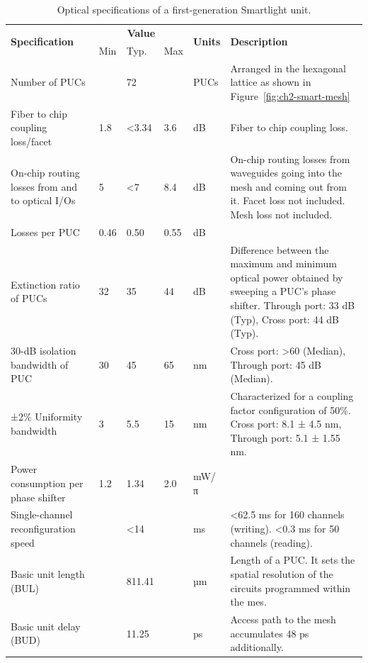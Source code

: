 \begin{table}[ht!]
  \small
	\centering
	\begin{tabular}{|m{4cm}|m{1.0cm}|m{1.0cm}|m{1.0cm}|m{1.5cm}|m{5.5cm}|}
		\hline
		\multirow{2}{*}{\textbf{Specification}}         & \multicolumn{3}{c|}{\textbf{Value}} & \multirow{2}{*}{\textbf{Units}} & \multirow{2}{*}{\textbf{Description}}                                                                                                                                                                                                                                                                                                                              \\
		\cline{2-4}  %
		           & Min     & Typ.     & Max  &   &
		\\
		\hline
    Number of PUCs   &    & 72    &      & PUCs   & Arranged in the hexagonal lattice as shown in Figure~\ref{fig:ch2-smart-mesh}
		\\
		\hline
		Fiber to chip coupling loss/facet & 1.8  & <3.34 & 3.6  & dB & Fiber to chip coupling loss.
    \\
		\hline
		On-chip routing losses from and to optical I/Os & 5 & <7 & 8.4 & dB & On-chip routing losses from waveguides going into the mesh and coming out from it. 
    Facet loss not included.
		Mesh loss not included.
		\\
		\hline
		Losses per PUC  & 0.46  & 0.50  & 0.55  & dB   & 
    \\
		\hline
		Extinction ratio of PUCs & 32 & 35  & 44  & dB  & Difference between the maximum and minimum optical power obtained by sweeping a PUC's phase shifter. 
    Through port: 33 dB (Typ), Cross port: 44 dB (Typ).
		\\
		\hline
		30-dB isolation bandwidth of PUC & 30 & 45 & 65 & nm & Cross port: >60 (Median), Through port: 45 dB (Median).
		\\
		\hline
		±2\% Uniformity bandwidth & 3 & 5.5 & 15 & nm & Characterized for a coupling factor configuration of 50\%.
		Cross port: 8.1 ± 4.5 nm, Through port: 5.1 ± 1.55 nm.
		\\
		\hline
		Power consumption per phase shifter & 1.2 & 1.34 & 2.0 & mW/π  & 
		\\
		\hline
		Single-channel reconfiguration speed & & <14 &  & ms & <62.5 ms for 160 channels (writing).
		<0.3 ms for 50 channels (reading). 
    \\
		\hline
    Basic unit length (BUL) & & 811.41 &  & µm   & Length of a PUC. It sets the spatial resolution of the circuits programmed within the mes.
    \\
		\hline
    Basic unit delay (BUD) & & 11.25 &  & ps & Access path to the mesh accumulates 48 ps additionally.
		\\
		\hline
	\end{tabular}
  \caption{Optical specifications of a first-generation Smartlight unit.}
  \label{tab:ch2-phot_specs}
\end{table}

